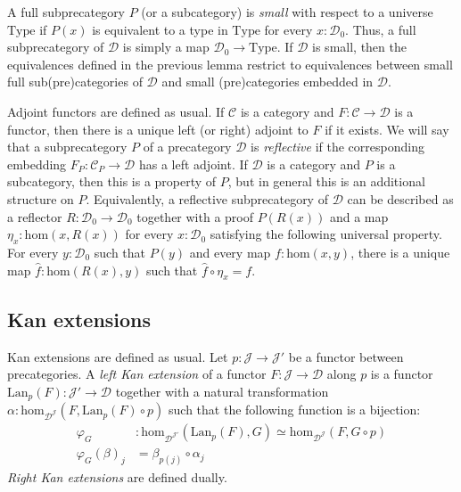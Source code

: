\documentclass[reqno]{amsart}
\theoremstyle{definition}
\theoremstyle{remark}
\newcommand{\fs}[1]{\mathrm{#1}}
\newcommand{\scat}[1]{\mathcal{#1}}
\renewcommand{\hom}{\fs{hom}}
\newcommand{\uType}{\fs{Type}}
\newcommand{\ob}[1]{#1_0}
\newcommand{\Prop}{\fs{Prop}}
\newcommand{\El}{\fs{El}}
\numberwithin{figure}{section}
\begin{document}
A full subprecategory $P$ (or a subcategory) is \emph{small} with respect to a universe $\uType$ if $P(x)$ is equivalent to a type in $\uType$ for every $x : \ob{\scat{D}}$.
Thus, a full subprecategory of $\scat{D}$ is simply a map $\ob{\scat{D}} \to \uType$.
If $\scat{D}$ is small, then the equivalences defined in the previous lemma restrict to equivalences between small full sub(pre)categories of $\scat{D}$ and small (pre)categories embedded in $\scat{D}$.


Adjoint functors are defined as usual.
If $\scat{C}$ is a category and $F : \scat{C} \to \scat{D}$ is a functor, then there is a unique left (or right) adjoint to $F$ if it exists.
We will say that a subprecategory $P$ of a precategory $\scat{D}$ is \emph{reflective} if the corresponding embedding $F_P : \scat{C}_P \to \scat{D}$ has a left adjoint.
If $\scat{D}$ is a category and $P$ is a subcategory, then this is a property of $P$, but in general this is an additional structure on $P$.
Equivalently, a reflective subprecategory of $\scat{D}$ can be described as a reflector $R : \ob{\scat{D}} \to \ob{\scat{D}}$
together with a proof $P(R(x))$ and a map $\eta_x : \hom(x,R(x))$ for every $x : \ob{\scat{D}}$ satisfying the following universal property.
For every $y : \scat{D}_0$ such that $P(y)$ and every map $f : \hom(x,y)$, there is a unique map $\widehat{f} : \hom(R(x),y)$ such that $\widehat{f} \circ \eta_x = f$.

\subsection{Kan extensions}

Kan extensions are defined as usual.
Let $p : \scat{J} \to \scat{J}'$ be a functor between precategories.
A \emph{left Kan extension} of a functor $F : \scat{J} \to \scat{D}$ along $p$ is a functor $\fs{Lan}_p(F) : \scat{J}' \to \scat{D}$
together with a natural transformation $\alpha : \hom_{\scat{D}^\scat{J}}(F, \fs{Lan}_p(F) \circ p)$ such that the following function is a bijection:
\begin{align*}
\varphi_G & : \hom_{\scat{D}^{\scat{J}'}}(\fs{Lan}_p(F),G) \simeq \hom_{\scat{D}^\scat{J}}(F, G \circ p) \\
\varphi_G(\beta)_j & = \beta_{p(j)} \circ \alpha_j
\end{align*}
\emph{Right Kan extensions} are defined dually.
\end{document}
